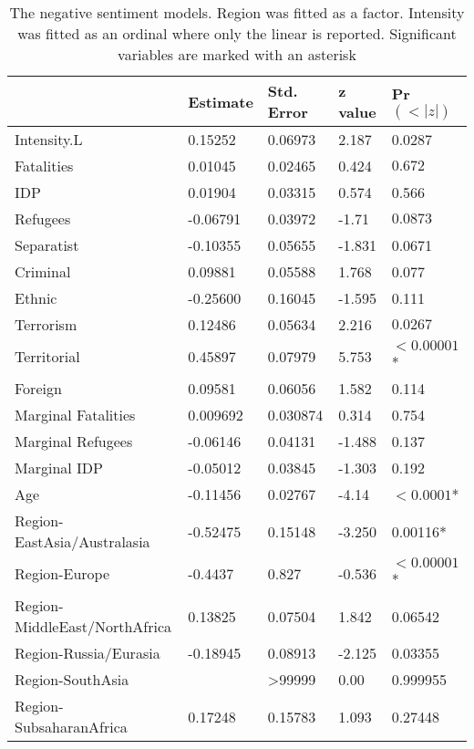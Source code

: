 \begin{table}
\centering
\begin{tabular}{l|llll}
& Estimate & Std. Error & z value & Pr$(<|z|)$  \\ \hline
Intensity.L & 0.15252 & 0.06973 & 2.187 & 0.0287 \\ 
Fatalities & 0.01045 &  0.02465 & 0.424 & $0.672$ \\ 
IDP & 0.01904 & 0.03315 & 0.574 & 0.566 \\ 
Refugees & -0.06791 & 0.03972 & -1.71 & $0.0873$ \\ 
Separatist & -0.10355 & 0.05655 & -1.831 & 0.0671 \\ 
Criminal & 0.09881 & 0.05588 & 1.768 & 0.077 \\ 
Ethnic & -0.25600 & 0.16045 & -1.595 & 0.111 \\ 
Terrorism & 0.12486 & 0.05634 & 2.216 &  $0.0267$ \\ 
Territorial & 0.45897 & 0.07979 & 5.753 & $<0.00001$* \\ 
Foreign & 0.09581 & 0.06056 & 1.582 & 0.114 \\ 
Marginal Fatalities & 0.009692 & 0.030874 & 0.314 & 0.754 \\ 
Marginal Refugees & -0.06146 & 0.04131 & -1.488 & 0.137 \\ 
Marginal IDP & -0.05012 & 0.03845 & -1.303 & 0.192 \\ 
Age & -0.11456 & 0.02767 & -4.14 & $<0.0001$* \\ 
Region-EastAsia/Australasia & -0.52475 & 0.15148 & -3.250 & 0.00116* \\ 
Region-Europe  & -0.4437 &  0.827 & -0.536 & $<0.00001$* \\ 
Region-MiddleEast/NorthAfrica & 0.13825 & 0.07504 & 1.842 & 0.06542 \\ 
Region-Russia/Eurasia & -0.18945 & 0.08913 & -2.125 & 0.03355 \\ 
Region-SouthAsia &  & >99999 & 0.00 & 0.999955 \\ 
Region-SubsaharanAfrica & 0.17248 & 0.15783 & 1.093 & 0.27448 \\ 
\end{tabular}
\caption{The negative sentiment models. Region was fitted as a factor. Intensity was fitted as an ordinal where only the linear is reported. Significant variables are marked with an asterisk}
\label{negfix}
\end{table}